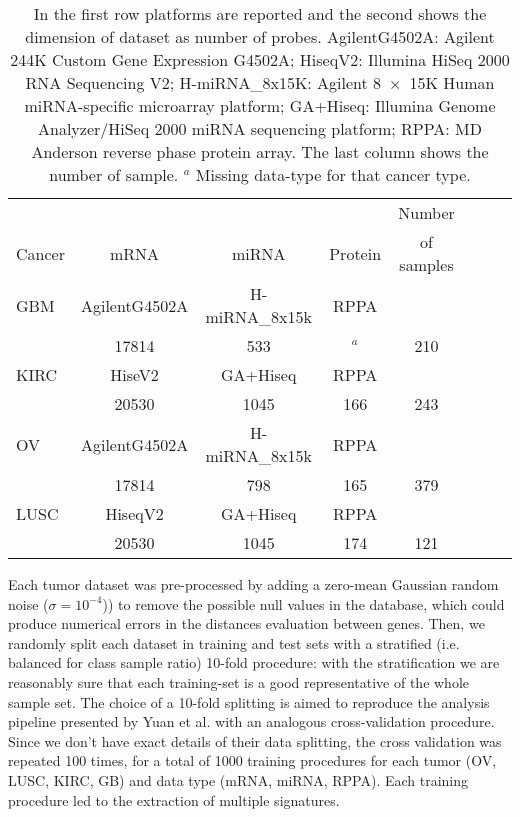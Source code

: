\documentclass{standalone}
\begin{document}
\begin{table}[htbp]
\centering
\begin{tabular}{lccccccc}
\hline \rowcolor{darkgrayrow}
         &               &                &          & Number       \\
\rowcolor{darkgrayrow}
Cancer   & mRNA          & miRNA          & Protein  & of samples   \\
\hline
GBM      & AgilentG4502A & H-miRNA\_8x15k & RPPA     &              \\
         & 17814         & 533            & $^a$     & 210          \\
KIRC     & HiseV2        & GA+Hiseq       & RPPA                    \\
         & 20530         & 1045           & 166      & 243          \\
OV       & AgilentG4502A & H-miRNA\_8x15k & RPPA     &              \\
         & 17814         & 798            & 165      & 379          \\
LUSC     & HiseqV2       & GA+Hiseq       & RPPA     &              \\
         & 20530         & 1045           & 174      & 121          \\
\hline
\end{tabular}
\caption{In the first row platforms are reported and the second shows the dimension of dataset as number of probes.
AgilentG4502A: Agilent 244K Custom Gene Expression G4502A;
HiseqV2: Illumina HiSeq 2000 RNA Sequencing V2;
H-miRNA\_8x15K: Agilent 8~×~15K Human miRNA-specific microarray platform;
GA+Hiseq: Illumina Genome Analyzer/HiSeq 2000 miRNA sequencing platform;
RPPA: MD Anderson reverse phase protein array.
The last column shows the number of sample.
\newline $^a$ Missing data-type for that cancer type.
}
\label{tab:synapse}
\end{table}

Each tumor dataset was pre-processed by adding a zero-mean Gaussian random noise ($\sigma = 10^{-4}$)) to remove the possible null values in the database, which could produce numerical errors in the distances evaluation between genes.
Then, we randomly split each dataset in training and test sets with a stratified (i.e. balanced for class sample ratio) 10-fold procedure: with the stratification we are reasonably sure that each training-set is a good representative of the whole sample set.
The choice of a 10-fold splitting is aimed to reproduce the analysis pipeline presented by Yuan et al. with an analogous cross-validation procedure.
Since we don't have exact details of their data splitting, the cross validation was repeated 100 times, for a total of 1000 training procedures for each tumor (OV, LUSC, KIRC, GB) and data type (mRNA, miRNA, RPPA).
Each training procedure led to the extraction of multiple signatures.
\end{document}
